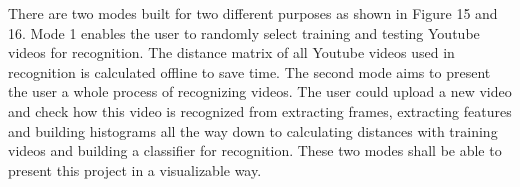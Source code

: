 \noindent There are two modes built for two different purposes as shown in Figure 15 and 16. Mode 1 enables the user to randomly select training and testing Youtube videos for recognition. The distance matrix of all Youtube videos used in recognition is calculated offline to save time. The second mode aims to present the user a whole process of recognizing videos. The user could upload a new video and check how this video is recognized from extracting frames, extracting features and building histograms all the way down to calculating distances with training videos and building a classifier for recognition. These two modes shall be able to present this project in a visualizable way. 